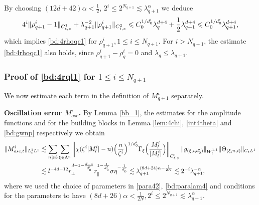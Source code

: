 \documentclass[10pt,a4paper]{amsart}
\numberwithin{equation}{section}
\def\({{\Big(}}
\def\){{\Big)}}
\newcommand{\norm}[1]{\left\|#1\right\|}
\def\geq{\geqslant}
\def\leq{\leqslant}
\def\({{\Big(}}
\def\){{\Big)}}
\def\geq{\geqslant}
\def\leq{\leqslant}
\begin{document}
By choosing $(12d+42)\alpha<\frac{1}{2}$, $2^i\leq2^{N_{q+1}}\lesssim\lambda_{q+1}^{\alpha}$ we deduce 
\begin{align}
    4^i\|\rho^{i}_{q+1} -1\|_{C_{t,x}^1}+\lambda_{q+1}^{-2}\|\rho^{i}_{q+1}\|_{C_{t,x}^2}%
    \leq C_0^{1/d_0'}\lambda_{q}^{d+4}+ \frac12\lambda_{q+1}^{d+4}\leq C_0^{1/d_0'}\lambda_{q+1}^{d+4},\notag
\end{align}
which implies  \eqref{bd:4rhoqc1} for $\rho^{i}_{q+1},1\leq i\leq N_{q+1}$. For $i>N_{q+1}$, the estimate \eqref{bd:4rhoqc1} also holds, since
$
\rho_{q+1}^i-\rho_q^i=0
$
and
$
\lambda_q\leq\lambda_{q+1}.
$

\subsubsection{Proof of  \eqref{bd:4rql1} for $1\leq i\leq N_{q+1}$}\label{sec:4estmq+1} We now estimate each term in the definition of $M_{q+1}^i$ separately.

 
\textbf{Oscillation error $M^{i}_{osc}$.} By Lemma \ref{bb_1}, the estimates for the amplitude functions and for the building blocks in  Lemma \ref{lem:4chi}, \eqref{int4theta} and \eqref{bd:gwnp} respectively   we obtain
\begin{align}
    \|M^{i}_{osc,t}\|_{L^1_tL^1}%
    &\lesssim \sum_{n\geq3}\sum_{\xi\in\Lambda^{n}}\norm{\chi(\zeta^{i}|M^{i}_l|-n)\(\frac{n}{\zeta^{i}}\)^{1/d_0'}\Gamma_{\xi}\(\frac{M^{i}_l}{|M^{i}_l|}\)}_{C_{t,x}^1}\|g_{(\xi,i,d_0')}\|_{W_t^{1,1}} \|\Theta_{(\xi,n,i)}\|_{C_tL^1}\notag\\
    &\lesssim l^{-4d-12}r_\perp^{d-1-\frac{d-1}{d_0'}}r_\parallel^{1-\frac{1}{d_0'}}\sigma \eta^{-\frac{1}{d_0'}}\lesssim \lambda_{q+1}^{(8d+24)\alpha-\frac 1{2N}}\lesssim2^{-i} \lambda_{q+1}^{-\alpha},\notag
\end{align}
where we used the choice of parameters in 
\eqref{para42},  \eqref{bd:paralam4} and  conditions for the parameters to have $(8d+26)\alpha<\frac 1{2N},2^i\leq2^{N_{q+1}}\lesssim \lambda_{q+1}^\alpha$.
\end{document}
